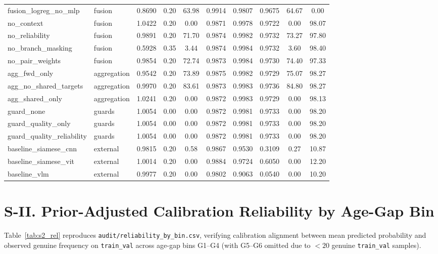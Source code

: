 \documentclass[journal]{IEEEtran}
\begin{document}
\begin{table}[t]
\begin{tabular}{@{}llcccccccc@{}}
fusion\_logreg\_no\_mlp & fusion & 0.8690 & 0.20 & 63.98 & 0.9914 & 0.9807 & 0.9675 & 64.67 & 0.00 \\
no\_context & fusion & 1.0422 & 0.20 & 0.00 & 0.9871 & 0.9978 & 0.9722 & 0.00 & 98.07 \\
no\_reliability & fusion & 0.9891 & 0.20 & 71.70 & 0.9874 & 0.9982 & 0.9732 & 73.27 & 97.80 \\
no\_branch\_masking & fusion & 0.5928 & 0.35 & 3.44 & 0.9874 & 0.9984 & 0.9732 & 3.60 & 98.40 \\
no\_pair\_weights & fusion & 0.9854 & 0.20 & 72.74 & 0.9873 & 0.9984 & 0.9730 & 74.40 & 97.33 \\
agg\_fwd\_only & aggregation & 0.9542 & 0.20 & 73.89 & 0.9875 & 0.9982 & 0.9729 & 75.07 & 98.27 \\
agg\_no\_shared\_targets & aggregation & 0.9970 & 0.20 & 83.61 & 0.9873 & 0.9983 & 0.9736 & 84.80 & 98.27 \\
agg\_shared\_only & aggregation & 1.0241 & 0.20 & 0.00 & 0.9872 & 0.9983 & 0.9729 & 0.00 & 98.13 \\
guard\_none & guards & 1.0054 & 0.00 & 0.00 & 0.9872 & 0.9981 & 0.9733 & 0.00 & 98.20 \\
guard\_quality\_only & guards & 1.0054 & 0.00 & 0.00 & 0.9872 & 0.9981 & 0.9733 & 0.00 & 98.20 \\
guard\_quality\_reliability & guards & 1.0054 & 0.00 & 0.00 & 0.9872 & 0.9981 & 0.9733 & 0.00 & 98.20 \\
baseline\_siamese\_cnn & external & 0.9815 & 0.20 & 0.58 & 0.9867 & 0.9530 & 0.3109 & 0.27 & 10.87 \\
baseline\_siamese\_vit & external & 1.0014 & 0.20 & 0.00 & 0.9884 & 0.9724 & 0.6050 & 0.00 & 12.20 \\
baseline\_vlm & external & 0.9977 & 0.20 & 0.00 & 0.9802 & 0.9063 & 0.0540 & 0.00 & 10.20 \\
\bottomrule
\end{tabular}
\end{table}

\section*{S-II. Prior-Adjusted Calibration Reliability by Age-Gap Bin}
Table~\ref{tab:s2_rel} reproduces \texttt{audit/reliability\_by\_bin.csv}, verifying calibration alignment between mean predicted probability and observed genuine frequency on \texttt{train\_val} across age-gap bins G1--G4 (with G5--G6 omitted due to $<20$ genuine \texttt{train\_val} samples).
\end{document}
